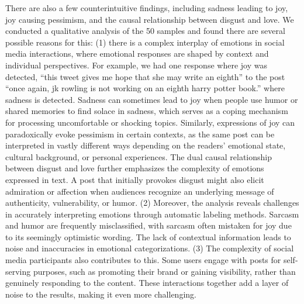 There are also a few counterintuitive findings, including sadness leading to joy, joy causing pessimism, and the causal relationship between disgust and love. We conducted a qualitative analysis of the 50 samples and found there are several possible reasons for this: (1) there is a complex interplay of emotions in social media interactions, where emotional responses are shaped by context and individual perspectives. For example, we had one response where joy was detected, ``this tweet gives me hope that she may write an eighth'' to the post ``once again, jk rowling is not working on an eighth harry potter book.'' where sadness is detected. Sadness can sometimes lead to joy when people use humor or shared memories to find solace in sadness, which serves as a coping mechanism for processing uncomfortable or shocking topics. Similarly, expressions of joy can paradoxically evoke pessimism in certain contexts, as the same post can be interpreted in vastly different ways depending on the readers' emotional state, cultural background, or personal experiences. The dual causal relationship between disgust and love further emphasizes the complexity of emotions expressed in text. A post that initially provokes disgust might also elicit admiration or affection when audiences recognize an underlying message of authenticity, vulnerability, or humor. (2) Moreover, the analysis reveals challenges in accurately interpreting emotions through automatic labeling methods. Sarcasm and humor are frequently misclassified, with sarcasm often mistaken for joy due to its seemingly optimistic wording. The lack of contextual information leads to noise and inaccuracies in emotional categorizations. (3) The complexity of social media participants also contributes to this. Some users engage with posts for self-serving purposes, such as promoting their brand or gaining visibility, rather than genuinely responding to the content. These interactions together add a layer of noise to the results, making it even more challenging.


